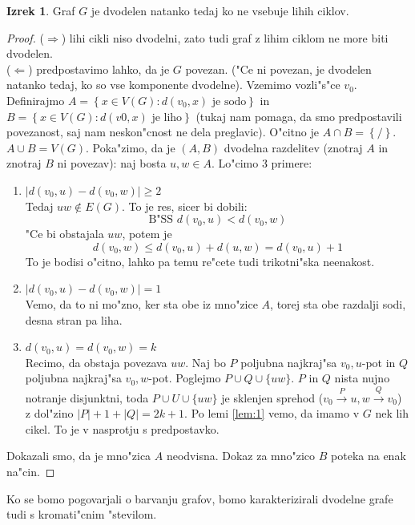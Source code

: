 \documentclass{article}
\theoremstyle{definition}
\newtheorem{theorem}{Izrek}[section]
\begin{document}
	\begin{theorem}
		Graf $G$ je dvodelen natanko tedaj ko ne vsebuje lihih ciklov. 
		\begin{proof} 
			($\Rightarrow$) lihi cikli niso dvodelni, zato tudi graf z lihim ciklom ne more biti dvodelen. \\ 
			($\Leftarrow$) predpostavimo lahko, da je $G$ povezan. ("Ce ni povezan, je dvodelen natanko tedaj, ko so vse komponente dvodelne). Vzemimo vozli"s"ce $v_0$. Definirajmo $A=\left\lbrace x \in V(G): d(v_0, x) \text{ je sodo}\right\rbrace$ in $B=\left\lbrace x \in V(G): d(v0, x) \text{ je liho}\right\rbrace$ (tukaj nam pomaga, da smo predpostavili povezanost, saj nam neskon"cnost ne dela preglavic). O"citno je $A \cap B = \left\lbrace/\right\rbrace$. $A \cup B = V(G)$. Poka"zimo, da je $(A,B)$ dvodelna razdelitev (znotraj $A$ in znotraj $B$ ni povezav): naj bosta $u,w \in A$. Lo"cimo 3 primere:
			\begin{enumerate}
				\item $|d(v_0, u) - d(v_0, w)| \geq 2$ \\
				Tedaj $uw \not\in E(G)$. To je res, sicer bi dobili:
				$$\text{B"SS } d(v_0, u) < d(v_0, w)$$
				"Ce bi obstajala $uw$, potem je
				$$d(v_0,w) \leq d(v_0, u) + d(u,w) = d(v_0, u) + 1$$
				To je bodisi o"citno, lahko pa temu re"cete tudi trikotni"ska neenakost.
				
				\item $|d(v_0, u) - d(v_0, w)| = 1$ \\
				Vemo, da to ni mo"zno, ker sta obe iz mno"zice $A$, torej sta obe razdalji sodi, desna stran pa liha.
				
				\item $d(v_0, u) = d(v_0, w) = k$ \\
				Recimo, da obstaja povezava $uw$. Naj bo $P$ poljubna najkraj"sa $v_0,u$-pot in $Q$ poljubna najkraj"sa $v_0,w$-pot. Poglejmo $P \cup Q \cup \lbrace u w \rbrace$. $P$ in $Q$ nista nujno notranje disjunktni, toda $P \cup U \cup \lbrace u w \rbrace$ je sklenjen sprehod
				($v_0 \overset{P}{\rightarrow} u,w \overset{Q}{\rightarrow} v_0 $) z dol"zino $|P| + 1 + |Q| = 2k+1$.
				Po lemi \ref{lem:1} vemo, da imamo v $G$ nek lih cikel. To je v nasprotju s predpostavko. 
			\end{enumerate}
			Dokazali smo, da je mno"zica $A$ neodvisna. Dokaz za mno"zico $B$ poteka na enak na"cin.
		\end{proof}
	\end{theorem}
	Ko se bomo pogovarjali o barvanju grafov, bomo karakterizirali dvodelne grafe tudi s kromati"cnim "stevilom.
	
\end{document}
